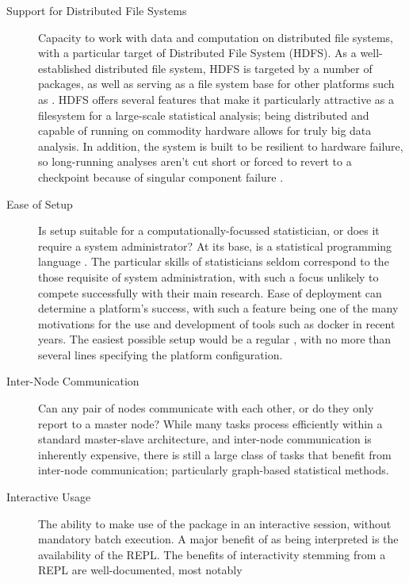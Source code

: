 \begin{description}
  \item[Support for Distributed File Systems]
    Capacity to work with data and computation on distributed file systems,
    with a particular target of  Distributed File System (HDFS). As a
    well-established distributed file system, HDFS is targeted by a number
    of \R{} packages, as well as serving as a file system base for other
    platforms such as  \cite{analytics:_rhadoop_wiki}
    \cite{deltarho:_rhipe}\cite{urbanek20}\cite{zaharia2016apache}. HDFS offers
    several features that make it particularly attractive as a filesystem
    for a large-scale statistical analysis; being distributed and capable of
    running on commodity hardware allows for truly big data analysis. In
    addition, the system is built to be resilient to hardware failure, so
    long-running analyses aren't cut short or forced to revert to a
    checkpoint because of singular component failure
    \cite{shvachko2010hadoop}.
  \item[Ease of Setup]
    Is setup suitable for a computationally-focussed statistician, or does
    it require a system administrator? At its base, \R{} is a statistical
    programming language \cite{rcore2020intro}. The particular skills of
    statisticians seldom correspond to the those requisite of system
    administration, with such a focus unlikely to compete successfully with
    their main research. Ease of deployment can determine a platform's
    success, with such a feature being one of the many motivations for the
    use and development of tools such as docker in recent years. The easiest
    possible setup would be a regular
    , with no more than
    several lines specifying the platform configuration.
  \item[Inter-Node Communication]
    Can any pair of nodes communicate with each other, or do they only
    report to a master node? While many tasks process efficiently within a
    standard master-slave architecture, and inter-node communication is
    inherently expensive, there is still a large class of tasks that benefit
    from inter-node communication\cite{walker1996mpi}; particularly
    graph-based statistical methods.
  \item[Interactive Usage]
    The ability to make use of the package in an interactive \R{} session,
    without mandatory batch execution. A major benefit of \R{} as being
    interpreted is the availability of the REPL. The benefits of
    interactivity stemming from a REPL are well-documented, most notably

\end{description}
